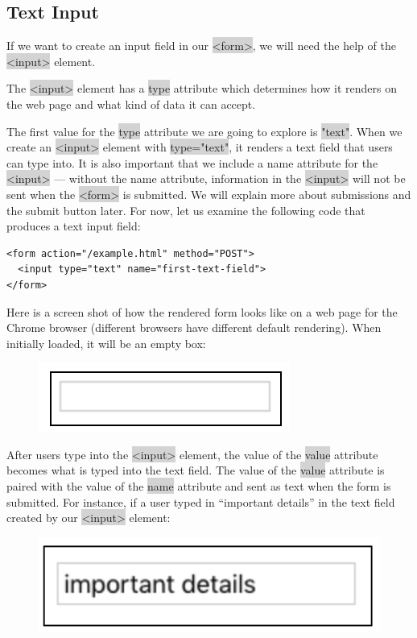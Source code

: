 \documentclass[11pt]{article}
\begin{document}
\subsection{Text Input}
If we want to create an input field in our \colorbox{lightgray}{<form>}, we will need the help of the \colorbox{lightgray}{<input>} element.

The \colorbox{lightgray}{<input>} element has a \colorbox{lightgray}{type} attribute which determines how it renders on the web page and what kind of data it can accept.

The first value for the \colorbox{lightgray}{type} attribute we are going to explore is \colorbox{lightgray}{"text"}. When we create an \colorbox{lightgray}{<input>} element with \colorbox{lightgray}{type="text"}, it renders a text field that users can type into. It is also important that we include a name attribute for the \colorbox{lightgray}{<input>} — without the name attribute, information in the \colorbox{lightgray}{<input>} will not be sent when the \colorbox{lightgray}{<form>} is submitted. We will explain more about submissions and the submit button later. For now, let us examine the following code that produces a text input field:
\begin{lstlisting}
<form action="/example.html" method="POST">
  <input type="text" name="first-text-field">
</form>
\end{lstlisting}
Here is a screen shot of how the rendered form looks like on a web page for the Chrome browser (different browsers have different default rendering). When initially loaded, it will be an empty box:
\begin{figure}[H]
\includegraphics[scale = 0.5]{3_2}
\centering
\end{figure}
\vspace{-4mm}
After users type into the \colorbox{lightgray}{<input>} element, the value of the \colorbox{lightgray}{value} attribute becomes what is typed into the text field. The value of the \colorbox{lightgray}{value} attribute is paired with the value of the \colorbox{lightgray}{name} attribute and sent as text when the form is submitted. For instance, if a user typed in “important details” in the text field created by our \colorbox{lightgray}{<input>} element:
\begin{figure}[H]
\includegraphics[scale = 0.5]{3_3}
\centering
\end{figure}
\end{document}
